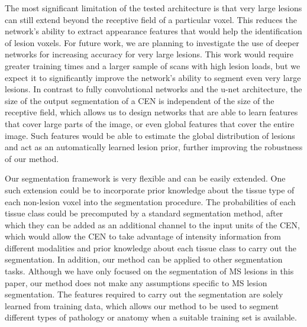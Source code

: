 The most significant limitation of the tested architecture is that very large
lesions can still extend beyond the receptive field of a particular voxel. This
reduces the network's ability to extract appearance features that would help the
identification of lesion voxels. For future work, we are planning to investigate
the use of deeper networks for increasing accuracy for very large lesions.
%
This work would require greater training times and a larger sample of scans with
high lesion loads, but we expect it to significantly improve the network's
ability to segment even very large lesions. In contrast to fully convolutional
networks and the u-net architecture, the size of the output segmentation of a
CEN is independent of the size of the receptive field, which allows us to design
networks that are able to learn features that cover large parts of the image, or
even global features that cover the entire image. Such features would be able to
estimate the global distribution of lesions and act as an automatically learned
lesion prior, further improving the robustness of our method.




Our segmentation framework is very flexible and can be easily extended. One such
extension could be to incorporate prior knowledge about the tissue type of each
non-lesion voxel into the segmentation procedure.
%
%
The probabilities of each tissue class could be precomputed by a standard
segmentation method, after which they can be added as an additional channel to
the input units of the CEN, which would allow the CEN to take advantage of
intensity information from different modalities and prior knowledge about each
tissue class to carry out the segmentation.
%
%
In addition, our method can be applied to other segmentation tasks. Although we
have only focused on the segmentation of MS lesions in this paper, our method
does not make any assumptions specific to MS lesion segmentation. The features
required to carry out the segmentation are solely learned from training data,
which allows our method to be used to segment different types of pathology or
anatomy when a suitable training set is available.

